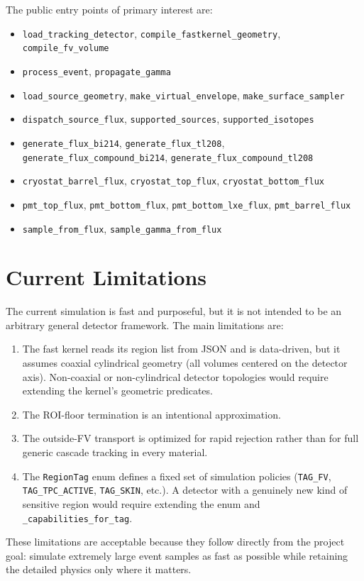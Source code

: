 \documentclass[11pt]{article}
\begin{document}
The public entry points of primary interest are:

\begin{itemize}
\item \texttt{load\_tracking\_detector},
      \texttt{compile\_fastkernel\_geometry},
      \texttt{compile\_fv\_volume}
\item \texttt{process\_event},
      \texttt{propagate\_gamma}
\item \texttt{load\_source\_geometry},
      \texttt{make\_virtual\_envelope},
      \texttt{make\_surface\_sampler}
\item \texttt{dispatch\_source\_flux},
      \texttt{supported\_sources},
      \texttt{supported\_isotopes}
\item \texttt{generate\_flux\_bi214},
      \texttt{generate\_flux\_tl208},
      \texttt{generate\_flux\_compound\_bi214},
      \texttt{generate\_flux\_compound\_tl208}
\item \texttt{cryostat\_barrel\_flux},
      \texttt{cryostat\_top\_flux},
      \texttt{cryostat\_bottom\_flux}
\item \texttt{pmt\_top\_flux},
      \texttt{pmt\_bottom\_flux},
      \texttt{pmt\_bottom\_lxe\_flux},
      \texttt{pmt\_barrel\_flux}
\item \texttt{sample\_from\_flux},
      \texttt{sample\_gamma\_from\_flux}
\end{itemize}

\section{Current Limitations}

The current simulation is fast and purposeful, but it is not intended to be an
arbitrary general detector framework. The main limitations are:

\begin{enumerate}[label=\arabic*.]
\item The fast kernel reads its region list from JSON and is data-driven, but
it assumes coaxial cylindrical geometry (all volumes centered on the detector
axis). Non-coaxial or non-cylindrical detector topologies would require
extending the kernel's geometric predicates.
\item The ROI-floor termination is an intentional approximation.
\item The outside-FV transport is optimized for rapid rejection rather than for
full generic cascade tracking in every material.
\item The \texttt{RegionTag} enum defines a fixed set of simulation policies
(\texttt{TAG\_FV}, \texttt{TAG\_TPC\_ACTIVE}, \texttt{TAG\_SKIN}, etc.). A
detector with a genuinely new kind of sensitive region would require extending
the enum and \texttt{\_capabilities\_for\_tag}.
\end{enumerate}

These limitations are acceptable because they follow directly from the project
goal: simulate extremely large event samples as fast as possible while retaining
the detailed physics only where it matters.
\end{document}
